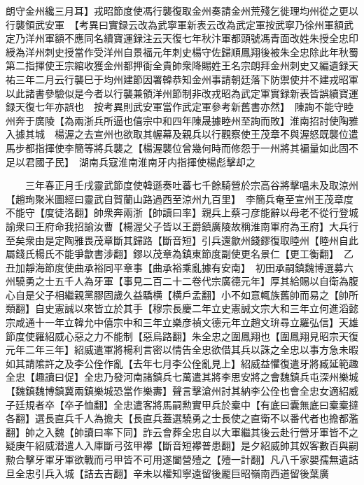 朗守金州纔三月耳】戎昭節度使馮行襲復取金州奏請金州荒殘乞徙理均州從之更以行襲領武安軍　【考異曰實録云改為武寧軍新表云改為武定軍按武寧乃徐州軍額武定乃洋州軍額不應同名續寶運録注云天復七年秋汴軍都頭號馮青面改姓朱授全忠印綬為洋州刺史授當作受洋州自景福元年刺史楊守佐歸順鳳翔後被朱全忠除此年秋蜀第二指揮使王宗綰收獲金州都押衙全貴帥衆降賜姓王名宗朗拜金州刺史又編遺録天祐三年二月云行襲巳于均州建節因署韓恭知金州事請朝廷落下防禦使并不建戎昭軍以此諸書參驗似是今者以行襲兼領洋州節制非改戎昭為武定軍實録新表皆誤續寶運録天復七年亦誤也　按考異則武安軍當作武定軍參考新舊書亦然】　陳詢不能守睦州奔于廣陵【為兩浙兵所逼也僖宗中和四年陳晟據睦州至詢而敗】淮南招討使陶雅入據其城　楊渥之去宣州也欲取其幄幕及親兵以行觀察使王茂章不與渥怒既襲位遣馬步都指揮使李簡等將兵襲之【楊渥襲位曾幾何時而修怨于一州將其褊量如此固不足以君國子民】　湖南兵寇淮南淮南牙内指揮使楊彪擊却之

　　三年春正月壬戌靈武節度使韓遜奏吐蕃七千餘騎營於宗高谷將擊嗢未及取涼州【趙珣聚米圖經曰靈武自賀蘭山路過西至涼州九百里】　李簡兵奄至宣州王茂章度不能守【度徒洛翻】帥衆奔兩浙【帥讀曰率】親兵上蔡刁彦能辭以母老不從行登城諭衆曰王府命我招諭汝曹【楊渥父子皆以王爵鎮廣陵故稱淮南軍府為王府】大兵行至矣衆由是定陶雅畏茂章斷其歸路【斷音短】引兵還歙州錢鏐復取睦州【睦州自此屬錢氏楊氏不能爭歙書涉翻】鏐以茂章為鎮東節度副使更名景仁【更工衡翻】　乙丑加靜海節度使曲承裕同平章事【曲承裕乘亂據有安南】　初田承嗣鎮魏博選募六州驍勇之士五千人為牙軍【事見二百二十二卷代宗廣德元年】厚其給賜以自衛為腹心自是父子相繼親黨膠固歲久益驕横【横戶孟翻】小不如意輒族舊帥而易之【帥所類翻】自史憲誠以來皆立於其手【穆宗長慶二年立史憲誠文宗大和三年立何進滔懿宗咸通十一年立韓允中僖宗中和三年立樂彦禎文德元年立趙文㺹尋立羅弘信】天雄節度使羅紹威心惡之力不能制【惡烏路翻】朱全忠之圍鳳翔也【圍鳳翔見昭宗天復元年二年三年】紹威遣軍將楊利言密以情告全忠欲借其兵以誅之全忠以事方急未暇如其請隂許之及李公佺作亂【去年七月李公佺亂見上】紹威益懼復遣牙將臧延範趣全忠【趣讀曰促】全忠乃發河南諸鎮兵七萬遣其將李思安將之會魏鎮兵屯深州樂城【魏鎮魏博鎮冀兩鎮樂城恐當作樂夀】聲言擊滄州討其納李公佺也會全忠女適紹威子廷規者卒【卒子恤翻】全忠遣客將馬嗣勲實甲兵於槖中【有底曰囊無底曰槖槖撻各翻】選長直兵千人為擔夫【長直兵蓋選驍勇之士長使之直衛不以番代者也擔都濫翻】帥之入魏【帥讀曰率下同】詐云會葬全忠自以大軍繼其後云赴行營牙軍皆不之疑庚午紹威潜遣人入庫斷弓弦甲襻【斷音短襻普患翻】是夕紹威帥其奴客數百與嗣勲合擊牙軍牙軍欲戰而弓甲皆不可用遂闔營殪之【殪一計翻】凡八千家嬰孺無遺詰旦全忠引兵入城【詰去吉翻】辛未以權知寧遠留後龎巨昭嶺南西道留後葉廣

